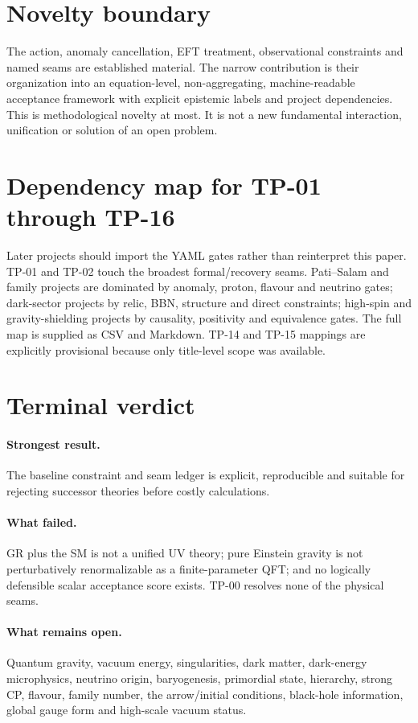 \documentclass[11pt,a4paper]{article}
\begin{document}
\section{Novelty boundary}
The action, anomaly cancellation, EFT treatment, observational constraints and named seams are established material. The narrow contribution is their organization into an equation-level, non-aggregating, machine-readable acceptance framework with explicit epistemic labels and project dependencies. This is methodological novelty at most. It is not a new fundamental interaction, unification or solution of an open problem.

\section{Dependency map for TP-01 through TP-16}
Later projects should import the YAML gates rather than reinterpret this paper. TP-01 and TP-02 touch the broadest formal/recovery seams. Pati--Salam and family projects are dominated by anomaly, proton, flavour and neutrino gates; dark-sector projects by relic, BBN, structure and direct constraints; high-spin and gravity-shielding projects by causality, positivity and equivalence gates. The full map is supplied as CSV and Markdown. TP-14 and TP-15 mappings are explicitly provisional because only title-level scope was available.

\section{Terminal verdict}
\paragraph{Strongest result.} The baseline constraint and seam ledger is explicit, reproducible and suitable for rejecting successor theories before costly calculations.

\paragraph{What failed.} GR plus the SM is not a unified UV theory; pure Einstein gravity is not perturbatively renormalizable as a finite-parameter QFT; and no logically defensible scalar acceptance score exists. TP-00 resolves none of the physical seams.

\paragraph{What remains open.} Quantum gravity, vacuum energy, singularities, dark matter, dark-energy microphysics, neutrino origin, baryogenesis, primordial state, hierarchy, strong CP, flavour, family number, the arrow/initial conditions, black-hole information, global gauge form and high-scale vacuum status.
\end{document}
